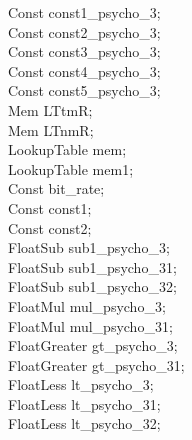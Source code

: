 \hspace*{2em}Const const1\_psycho\_3; \\
\hspace*{2em}Const const2\_psycho\_3; \\
\hspace*{2em}Const const3\_psycho\_3; \\
\hspace*{2em}Const const4\_psycho\_3; \\
\hspace*{2em}Const const5\_psycho\_3; \\
\hspace*{2em}Mem LTtmR; \\
\hspace*{2em}Mem LTnmR; \\
\hspace*{2em}LookupTable mem; \\
\hspace*{2em}LookupTable mem1; \\
\hspace*{2em}Const bit\_rate; \\
\hspace*{2em}Const const1; \\
\hspace*{2em}Const const2; \\
\hspace*{2em}FloatSub sub1\_psycho\_3; \\
\hspace*{2em}FloatSub sub1\_psycho\_31; \\
\hspace*{2em}FloatSub sub1\_psycho\_32; \\
\hspace*{2em}FloatMul mul\_psycho\_3; \\
\hspace*{2em}FloatMul mul\_psycho\_31; \\
\hspace*{2em}FloatGreater gt\_psycho\_3; \\
\hspace*{2em}FloatGreater gt\_psycho\_31; \\
\hspace*{2em}FloatLess lt\_psycho\_3; \\
\hspace*{2em}FloatLess lt\_psycho\_31; \\
\hspace*{2em}FloatLess lt\_psycho\_32; \\
